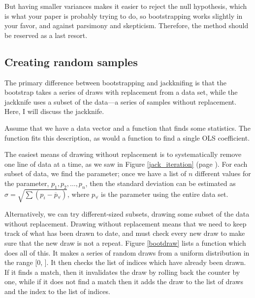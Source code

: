 
But having smaller variances makes
it easier to reject the null hypothesis, which is what your paper is
probably trying to do, so bootstrapping works slightly in your favor,
and against parsimony and skepticism. Therefore, the method should be
reserved as a last resort.

\subsection{Creating random samples} 
The primary difference between bootstrapping and jackknifing is that
the bootstrap takes a series of draws with replacement from a data set,
while the jackknife uses a subset of the data---a series of samples
without replacement. Here, I will discuss the jackknife.

Assume that we have a
data vector  and a function  that finds some statistics. The
function  fits this description, as would a function to find
a single OLS coefficient.


The easiest means of drawing without replacement is to
systematically remove one line of data at a time, as we saw in Figure
\ref{jack_iteration} (page \pageref{jack_iteration}). For each subset of data, we find the parameter;
once we have a list of $n$ different values for the parameter, $p_1,
p_2, \dots, p_n$, then the standard deviation can be estimated as
$\hat\sigma = \sqrt{\sum{(p_i - \overline p_{\forall})}}$, where $p_{\forall}$ is
the parameter using the entire data set.


Alternatively, we can try different-sized subsets,
drawing some subset of the data
without replacement. Drawing without replacement means that we need to
keep track of what has been drawn to date, and must check every new draw
to make sure that the new draw is not a repeat. Figure \ref{bootdraw} lists a function which
does all of this. It makes a series of random draws from a uniform distribution in the range
[0, ]. It then checks the list of indices which have
already been drawn. If it finds a match, then it invalidates the draw
by rolling back the counter by one, while if it does not find a match then it
adds the draw to the list of draws and the index to the list of indices.

